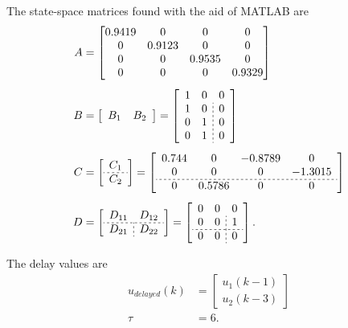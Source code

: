\documentclass[12pt]{article}
\begin{document}
The state-space matrices found with the aid of MATLAB are
\begin{subequations}
\begin{align}
A &=
\begin{bmatrix}
0.9419 & 0 & 0 & 0 \\
0 & 0.9123 & 0 & 0 \\
0 & 0 & 0.9535 & 0 \\
0 & 0 & 0 & 0.9329
\end{bmatrix} \\[1ex]
B &=
\left[
\begin{array}{c;{2pt/2pt}c}
B_1 & B_2
\end{array}
\right] 
=
\left[
\begin{array}{c c ;{2pt/2pt} c}
1 & 0 & 0\\
1 & 0 & 0\\
0 & 1 & 0\\
0 & 1 & 0
\end{array}
\right] 
\\[1ex]
C &=
\left[
\begin{array}{c}
C_1 \\ \hdashline[2pt/2pt]
C_2
\end{array}
\right] 
=
\left[
\begin{array}{c c c c}
0.744 & 0 & -0.8789 & 0 \\
0 & 0 & 0 & -1.3015 \\ \hdashline[2pt/2pt]
0 & 0.5786 & 0 & 0
\end{array}
\right] 
\\[1ex]
D &= 
\left[
\begin{array}{c;{2pt/2pt}c}
D_{11} & D_{12} \\ \hdashline[2pt/2pt]
D_{21} & D_{22} 
\end{array}
\right]
=
\left[
\begin{array}{c c ;{2pt/2pt} c}
0 & 0 & 0\\
0 & 0 & 1\\ \hdashline[2pt/2pt]
0 & 0 & 0
\end{array}
\right].
\end{align} \label{eq8}
\end{subequations}

The delay values are
\begin{subequations}
\begin{align}
u_{delayed}(k) &= 
\begin{bmatrix}
u_1(k-1)\\
u_2(k-3)
\end{bmatrix} \label{eq9a}\\[1ex]
\tau &= 6.
\end{align} \label{eq9}
\end{subequations}
\end{document}
